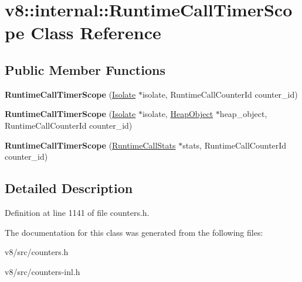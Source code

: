 \hypertarget{classv8_1_1internal_1_1RuntimeCallTimerScope}{}\section{v8\+:\+:internal\+:\+:Runtime\+Call\+Timer\+Scope Class Reference}
\label{classv8_1_1internal_1_1RuntimeCallTimerScope}
\subsection*{Public Member Functions}
\begin{DoxyCompactItemize}
\item 
\mbox{\label{classv8_1_1internal_1_1RuntimeCallTimerScope_a44cda99262cf0cf9aeb0d4d2b0457265}} 
{\bfseries Runtime\+Call\+Timer\+Scope} (\mbox{\hyperlink{classv8_1_1internal_1_1Isolate}{Isolate}} $\ast$isolate, Runtime\+Call\+Counter\+Id counter\+\_\+id)
\item 
\mbox{\label{classv8_1_1internal_1_1RuntimeCallTimerScope_a71f75cc8ae7237f11a4543dbbd09f7d7}} 
{\bfseries Runtime\+Call\+Timer\+Scope} (\mbox{\hyperlink{classv8_1_1internal_1_1Isolate}{Isolate}} $\ast$isolate, \mbox{\hyperlink{classv8_1_1internal_1_1HeapObject}{Heap\+Object}} $\ast$heap\+\_\+object, Runtime\+Call\+Counter\+Id counter\+\_\+id)
\item 
\mbox{\label{classv8_1_1internal_1_1RuntimeCallTimerScope_abf2fad01b1ae377eeb133f71b6699bc8}} 
{\bfseries Runtime\+Call\+Timer\+Scope} (\mbox{\hyperlink{classv8_1_1internal_1_1RuntimeCallStats}{Runtime\+Call\+Stats}} $\ast$stats, Runtime\+Call\+Counter\+Id counter\+\_\+id)
\end{DoxyCompactItemize}


\subsection{Detailed Description}


Definition at line 1141 of file counters.\+h.



The documentation for this class was generated from the following files\+:\begin{DoxyCompactItemize}
\item 
v8/src/counters.\+h\item 
v8/src/counters-\/inl.\+h\end{DoxyCompactItemize}
